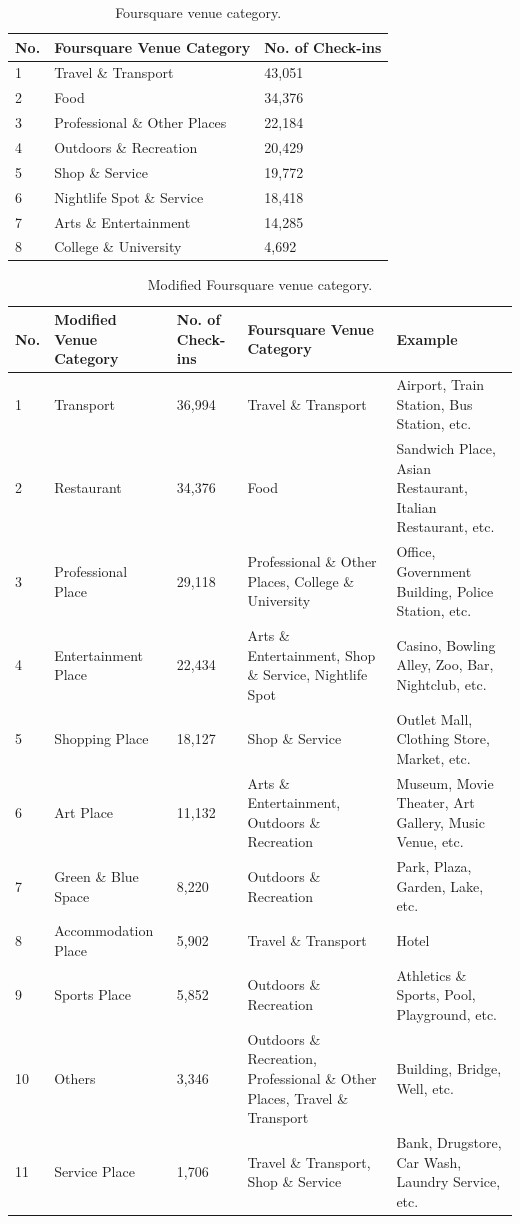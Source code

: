 \documentclass{article}
\begin{document}
\begin{table}
\centering
\caption{\label{tab:foursquare_category}Foursquare venue category.}
\begin{tabular}{lll} \hline
No. & Foursquare Venue Category & No. of Check-ins \\ \hline
1 & Travel \& Transport & 43,051 \\
2 & Food & 34,376 \\
3 & Professional \& Other Places & 22,184 \\
4 & Outdoors \& Recreation & 20,429 \\
5 & Shop \& Service & 19,772 \\
6 & Nightlife Spot \& Service & 18,418 \\
7 & Arts \& Entertainment & 14,285 \\
8 & College \& University & 4,692 \\ \hline
\end{tabular}
\end{table}


\begin{table}
\centering
\caption{\label{tab:modified_category}Modified Foursquare venue category.}
\begin{adjustbox}{max width=\textwidth, margin=0cm}
\begin{tabular}{lllp{6cm}p{5cm}} \hline
No. & Modified Venue Category & No. of Check-ins & Foursquare Venue Category 
& Example \\ \hline
1 & Transport & 36,994 & Travel \& Transport & Airport, Train Station, Bus Station, etc. \\
2 & Restaurant & 34,376 & Food & Sandwich Place, Asian Restaurant, Italian Restaurant, etc. \\
3 & Professional Place & 29,118 & Professional \& Other Places, College \& University & Office, Government Building, Police Station, etc. \\
4 & Entertainment Place & 22,434 & Arts \& Entertainment, Shop \& Service, Nightlife Spot & Casino, Bowling Alley, Zoo, Bar, Nightclub, etc. \\
5 & Shopping Place & 18,127 & Shop \& Service & Outlet Mall, Clothing Store, Market, etc. \\
6 & Art Place & 11,132 & Arts \& Entertainment, Outdoors \& Recreation & Museum, Movie Theater, Art Gallery, Music Venue, etc. \\
7 & Green \& Blue Space & 8,220 & Outdoors \& Recreation & Park, Plaza, Garden, Lake, etc. \\
8 & Accommodation Place & 5,902 & Travel \& Transport & Hotel \\
9 & Sports Place & 5,852 & Outdoors \& Recreation & Athletics \& Sports, Pool, Playground, etc. \\
10 & Others & 3,346 & Outdoors \& Recreation, Professional \& Other Places, Travel \& Transport & Building, Bridge, Well, etc. \\
11 & Service Place & 1,706 & Travel \& Transport, Shop \& Service & Bank, Drugstore, Car Wash, Laundry Service, etc. \\ \hline
\end{tabular}
\end{adjustbox}
\end{table}
\end{document}
